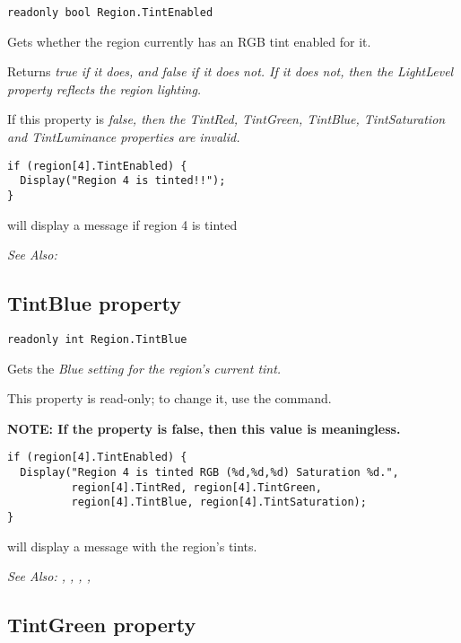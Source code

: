 \begin{verbatim}
readonly bool Region.TintEnabled
\end{verbatim}
Gets whether the region currently has an RGB tint enabled for it.

Returns \it{true} if it does, and \it{false} if it does not. If it does not, then
the LightLevel property reflects the region lighting.

If this property is \it{false}, then the TintRed, TintGreen, TintBlue, TintSaturation and TintLuminance
properties are invalid.

\begin{verbatim}
if (region[4].TintEnabled) {
  Display("Region 4 is tinted!!");
}
\end{verbatim}
will display a message if region 4 is tinted

\it{See Also:} 


\subsection{TintBlue property}\label{Region.TintBlue}%

\begin{verbatim}
readonly int Region.TintBlue
\end{verbatim}
Gets the \it{Blue} setting for the region's current tint.

This property is read-only; to change it, use the  command.

\bf{NOTE:} If the  property is false, then
this value is meaningless.

\begin{verbatim}
if (region[4].TintEnabled) {
  Display("Region 4 is tinted RGB (%d,%d,%d) Saturation %d.",
          region[4].TintRed, region[4].TintGreen,
          region[4].TintBlue, region[4].TintSaturation);
}
\end{verbatim}
will display a message with the region's tints.

\it{See Also:} , ,
, ,


\subsection{TintGreen property}\label{Region.TintGreen}%

